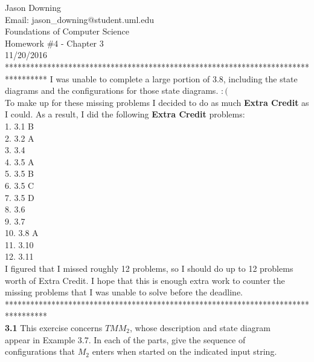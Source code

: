 \documentclass[12pt]{article}
\begin{document}
\noindent
Jason Downing \\
Email: jason\_downing@student.uml.edu \\
Foundations of Computer Science \\
Homework \#4 - Chapter 3 \\
11/20/2016 \\

**********************************************************************************
I was unable to complete a large portion of 3.8, including the state diagrams
and the configurations for those state diagrams. $:($ \\
To make up for these missing problems I decided to do as much \textbf{Extra Credit}
as I could. As a result, I did the following \textbf{Extra Credit} problems: \\

1. 3.1 B \\
2. 3.2 A \\
3. 3.4 \\
4. 3.5 A \\
5. 3.5 B \\
6. 3.5 C \\
7. 3.5 D \\
8. 3.6 \\ 
9. 3.7 \\
10. 3.8 A \\ 
11. 3.10 \\
12. 3.11 \\

I figured that I missed roughly 12 problems, so I should do up to 12 problems
worth of Extra Credit. I hope that this is enough extra work to counter the
missing problems that I was unable to solve before the deadline. \\

********************************************************************************** \\

\pagebreak
\noindent
\textbf{3.1} This exercise concerns $TM M_2$, whose description and state diagram \\
appear in Example 3.7. In each of the parts, give the sequence of \\
configurations that $M_2$ enters when started on the indicated input string. \\
\end{document}
